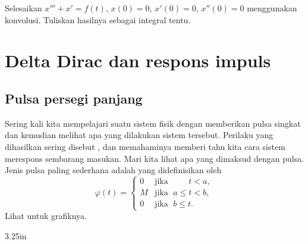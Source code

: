\begin{exercise}
Selesaikan $x'''+x' = f(t)$, $x(0) = 0$, $x'(0)=0$, $x''(0)=0$ menggunakan konvolusi.
Tuliskan hasilnya sebagai integral tentu.
\end{exercise}


\sectionnewpage
\section{Delta Dirac dan respons impuls}
\label{diracdelta:section}



\subsection{Pulsa persegi panjang}

Sering kali kita mempelajari suatu sistem fisik dengan memberikan pulsa singkat 
dan kemudian melihat apa yang dilakukan sistem tersebut.
Perilaku yang dihasilkan
sering disebut \emph{},
dan memahaminya memberi tahu kita cara sistem merespons sembarang masukan.
Mari kita lihat apa yang dimaksud dengan pulsa.
Jenis pulsa paling sederhana adalah
\emph{}
yang didefinisikan oleh
\begin{equation*}
\varphi(t) = 
\begin{cases}
0 & \text{jika } \; \phantom{a \leq {}} t < a , \\
M & \text{jika } \; a \leq t < b , \\
0 & \text{jika } \; b \leq t .
\end{cases}
\end{equation*}
Lihat  untuk grafiknya.

\begin{mywrapfig}[14]{3.25in}
\capstart
{}
\caption{Contoh pulsa persegi panjang dengan $a=0.5$, $b=1$, dan $M = 2$.\label{lt:sqpulse}}
\end{mywrapfig}

